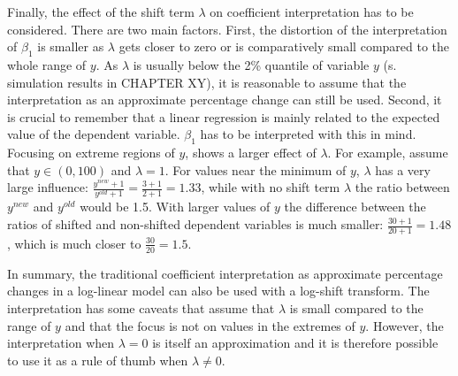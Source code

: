 Finally, the effect of the shift term $\lambda$ on coefficient interpretation has to be considered.
There are two main factors.
First, the distortion of the interpretation of $\beta_1$ is smaller as $\lambda$ gets closer to zero or is comparatively small compared to the whole range of $y$.
As $\lambda$ is usually below the 2\% quantile of variable $y$ (s. simulation results in CHAPTER XY), it is reasonable to assume that the interpretation as an approximate percentage change can still be used.
Second, it is crucial to remember that a linear regression is mainly related to the expected value of the dependent variable.
$\beta_1$ has to be interpreted with this in mind.
Focusing on extreme regions of $y$, shows a larger effect of $\lambda$.
For example, assume that $y \in (0, 100)$ and $\lambda = 1$.
For values near the minimum of $y$, $\lambda$ has a very large influence: $\frac{y^{new} + 1 } {y^{old} + 1} = \frac{3 + 1}  {2 + 1} = 1.33$, while with no shift term $\lambda$ the ratio between $y^{new}$ and $y^{old}$ would be 1.5. With larger values of $y$ the difference between the ratios of shifted and non-shifted dependent variables is much smaller: $\frac{30 + 1}{20 + 1} = 1.48$, which is much closer to $\frac{30}{20} = 1.5$.

In summary, the traditional coefficient interpretation as approximate percentage changes in a log-linear model can also be used with a log-shift transform.
The interpretation has some caveats that assume that $\lambda$ is small compared to the range of $y$ and that the focus is not on values in the extremes of $y$.
However, the interpretation when $\lambda = 0$ is itself an approximation and it is therefore possible to use it as a rule of thumb when $\lambda \ne 0$.